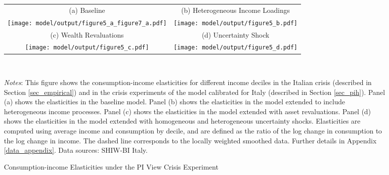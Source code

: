 \documentclass[12pt]{article}
\begin{document}
\begin{spacing}{1.5}
\begin{figure}[H]
\caption{Consumption-income Elasticities under the PI View Crisis Experiment}
\label{fig:pih_cie}
\begin{tabular}{cc}
(a) Baseline & (b) Heterogeneous Income Loadings \\
\texttt{[image: model/output/figure5\_a\_figure7\_a.pdf]} &
\texttt{[image: model/output/figure5\_b.pdf]} \\
(c) Wealth Revaluations & (d) Uncertainty Shock \\
\texttt{[image: model/output/figure5\_c.pdf]} &
\texttt{[image: model/output/figure5\_d.pdf]}
\end{tabular} \smallskip \\
\raggedright{}\textit{\footnotesize{}Notes}{: \footnotesize{This figure shows the consumption-income elasticities for different income deciles in the Italian crisis (described in Section \ref{sec_empirical}) and in the crisis experiments of the model calibrated for Italy (described in Section \ref{sec_pih}). Panel (a) shows  the elasticities in the baseline model.  Panel (b) shows the elasticities in the model extended to include heterogeneous income processes.  Panel (c) shows the elasticities in the model extended with asset revaluations.  Panel (d) shows the elasticities in the model extended with homogeneous and heterogeneous uncertainty shocks.  Elasticities are computed using average income and consumption by decile, and are defined as the ratio of the log change in consumption to the log change in income. The dashed line corresponds to the locally weighted smoothed data. Further details in Appendix \ref{data_appendix}.
Data sources: SHIW-BI Italy.
}}{\footnotesize\par}
\end{figure}



\end{spacing}
\end{document}
